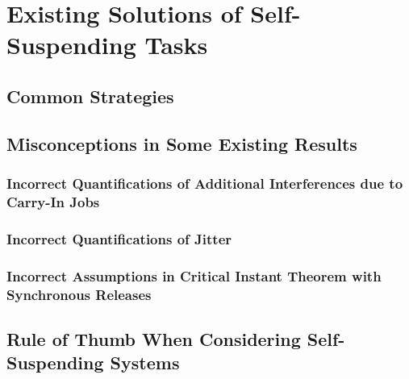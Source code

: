 \section{Existing Solutions of Self-Suspending Tasks}

\subsection{Common Strategies}
\subsection{Misconceptions in Some Existing Results}
\subsubsection{Incorrect Quantifications of Additional Interferences due to Carry-In Jobs}
\subsubsection{Incorrect Quantifications of Jitter}
\subsubsection{Incorrect Assumptions in Critical Instant Theorem with Synchronous Releases}
\subsection{Rule of Thumb When Considering Self-Suspending Systems}
  
